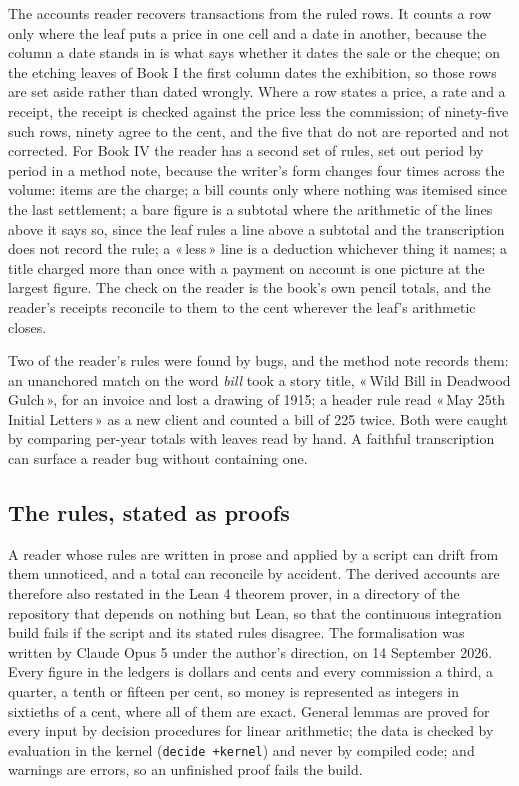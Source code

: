 \documentclass[11pt]{article}
\newcommand{\q}[1]{«\,#1\,»}
\begin{document}
The accounts reader recovers transactions from the ruled rows. It counts a row only where the leaf puts a price in one cell and a date in another, because the column a date stands in is what says whether it dates the sale or the cheque; on the etching leaves of Book I the first column dates the exhibition, so those rows are set aside rather than dated wrongly. Where a row states a price, a rate and a receipt, the receipt is checked against the price less the commission; of ninety-five such rows, ninety agree to the cent, and the five that do not are reported and not corrected. For Book IV the reader has a second set of rules, set out period by period in a method note, because the writer's form changes four times across the volume: items are the charge; a bill counts only where nothing was itemised since the last settlement; a bare figure is a subtotal where the arithmetic of the lines above it says so, since the leaf rules a line above a subtotal and the transcription does not record the rule; a \q{less} line is a deduction whichever thing it names; a title charged more than once with a payment on account is one picture at the largest figure. The check on the reader is the book's own pencil totals, and the reader's receipts reconcile to them to the cent wherever the leaf's arithmetic closes.

Two of the reader's rules were found by bugs, and the method note records them: an unanchored match on the word \emph{bill} took a story title, \q{Wild Bill in Deadwood Gulch}, for an invoice and lost a drawing of 1915; a header rule read \q{May 25th Initial Letters} as a new client and counted a bill of 225 twice. Both were caught by comparing per-year totals with leaves read by hand. A faithful transcription can surface a reader bug without containing one.

\subsection{The rules, stated as proofs}

A reader whose rules are written in prose and applied by a script can drift from them unnoticed, and a total can reconcile by accident. The derived accounts are therefore also restated in the Lean 4 theorem prover, in a directory of the repository that depends on nothing but Lean, so that the continuous integration build fails if the script and its stated rules disagree. The formalisation was written by Claude Opus 5 under the author's direction, on 14 September 2026. Every figure in the ledgers is dollars and cents and every commission a third, a quarter, a tenth or fifteen per cent, so money is represented as integers in sixtieths of a cent, where all of them are exact. General lemmas are proved for every input by decision procedures for linear arithmetic; the data is checked by evaluation in the kernel (\texttt{decide +kernel}) and never by compiled code; and warnings are errors, so an unfinished proof fails the build.
\end{document}
